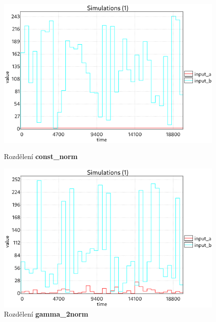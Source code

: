 \begin{figure}[H]
\centering
\begin{minipage}{.5\textwidth}
  \centering
  \includegraphics[width=0.95\linewidth]{obrazky-figures/inputs_const_norm.png}
  \caption{Rozdělení \textbf{const\_norm}}
  \label{fig:inputs_const_norm}
\end{minipage}%
\begin{minipage}{.5\textwidth}
  \centering
  \includegraphics[width=0.95\linewidth]{obrazky-figures/inputs_gamma_2norm.png}
  \caption{Rozdělení \textbf{gamma\_2norm}}
  \label{fig:inputs_gamma_2norm}
\end{minipage}
\end{figure}

